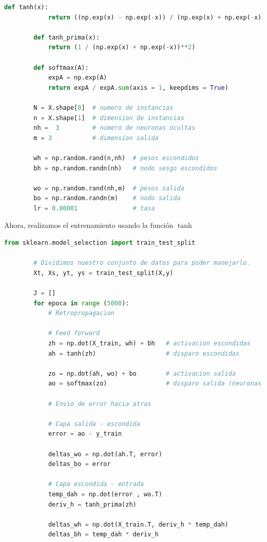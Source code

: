 \documentclass[letterpaper,11pt]{article}
\begin{document}
\begin{enumerate}
\begin{enumerate}
\begin{lstlisting}[language=Python]
        def tanh(x):
            return ((np.exp(x) - np.exp(-x)) / (np.exp(x) + np.exp(-x)))

        def tanh_prima(x):
            return (1 / (np.exp(x) + np.exp(-x))**2)

        def softmax(A):
            expA = np.exp(A)
            return expA / expA.sum(axis = 1, keepdims = True)

        N = X.shape[0]  # numero de instancias
        n = X.shape[1]  # dimension de instancias
        nh =  3         # numero de neuronas ocultas
        m = 3           # dimension salida

        wh = np.random.rand(n,nh)  # pesos escondidos
        bh = np.random.randn(nh)   # nodo sesgo escondidos

        wo = np.random.rand(nh,m)  # pesos salida
        bo = np.random.randn(m)    # nodo salida
        lr = 0.00001               # tasa
        \end{lstlisting}

        \newpage
        Ahora, realizamos el entrenamiento usando la función $\tanh$
        \begin{lstlisting}[language=Python]
        from sklearn.model_selection import train_test_split

        # Dividimos nuestro conjunto de datos para poder manejarlo.
        Xt, Xs, yt, ys = train_test_split(X,y)

        J = []
        for epoca in range (5000):
            # Retropropagacion
            
            # Feed forward
            zh = np.dot(X_train, wh) + bh   # activacion escondidas
            ah = tanh(zh)                   # disparo escondidas

            zo = np.dot(ah, wo) + bo        # activacion salida 
            ao = softmax(zo)                # disparo salida (neuronas salida)
            
            # Envio de error hacia atras
            
            # Capa salida - escondida  
            error = ao - y_train

            deltas_wo = np.dot(ah.T, error)
            deltas_bo = error

            # Capa escondida - entrada
            temp_dah = np.dot(error , wo.T)
            deriv_h = tanh_prima(zh)

            deltas_wh = np.dot(X_train.T, deriv_h * temp_dah)
            deltas_bh = temp_dah * deriv_h


\end{lstlisting}
\end{enumerate}
\end{enumerate}
\end{document}
